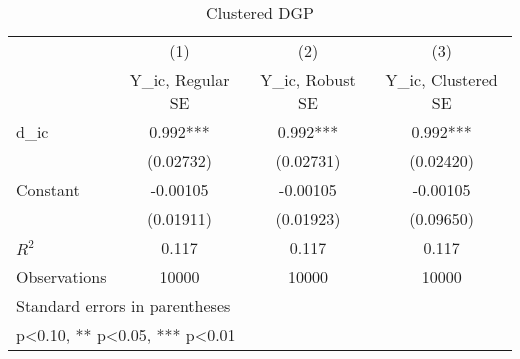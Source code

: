 \begin{table}[htbp]\centering
\def\sym#1{\ifmmode^{#1}\else\(^{#1}\)\fi}
\caption{Clustered DGP}
\begin{tabular}{l*{3}{c}}
\toprule
                    &\multicolumn{1}{c}{(1)}&\multicolumn{1}{c}{(2)}&\multicolumn{1}{c}{(3)}\\
                    &\multicolumn{1}{c}{Y\_ic, Regular SE}&\multicolumn{1}{c}{Y\_ic, Robust SE}&\multicolumn{1}{c}{Y\_ic, Clustered SE}\\
\midrule
d\_ic                &       0.992***&       0.992***&       0.992***\\
                    &   (0.02732)   &   (0.02731)   &   (0.02420)   \\
\addlinespace
Constant            &    -0.00105   &    -0.00105   &    -0.00105   \\
                    &   (0.01911)   &   (0.01923)   &   (0.09650)   \\
\midrule
\(R^{2}\)           &       0.117   &       0.117   &       0.117   \\
Observations        &       10000   &       10000   &       10000   \\
\bottomrule
\multicolumn{4}{l}{\footnotesize Standard errors in parentheses}\\
\multicolumn{4}{l}{\footnotesize * p<0.10, ** p<0.05, *** p<0.01}\\
\end{tabular}
\end{table}

